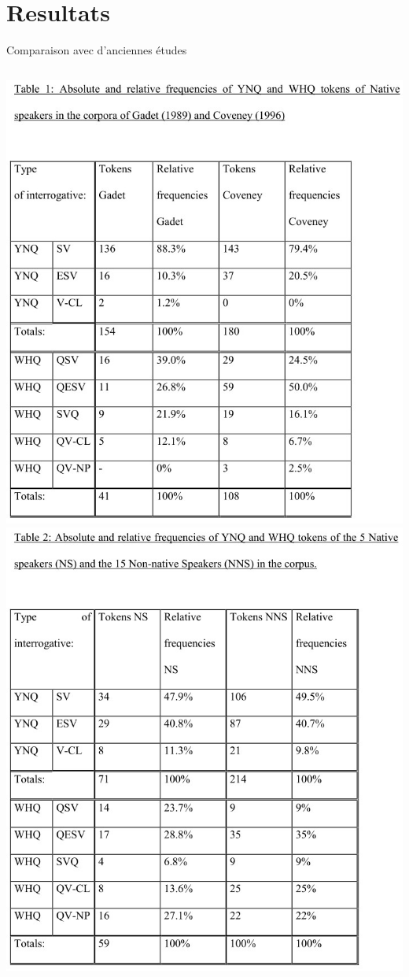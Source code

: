 \documentclass{beamer}
\begin{document}
  \section{Resultats}
    \begin{frame}[t]{Comparaison avec d'anciennes études}
      \begin{columns}
          \includegraphics[scale=0.32]{gadet_coveney.jpg}
          \includegraphics[scale=0.32]{resultats.jpg}
      \end{columns}
    \end{frame}
\end{document}
